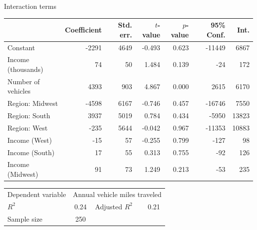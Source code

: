 \begin{frame}{Interaction terms}
  \small
  \begin{tabular}{lrrrrrr}
\toprule
{} &  Coefficient &  Std. err. &  $t$-value &  $p$-value &  95\% Conf. &   Int. \\
\midrule
Constant           &        -2291 &       4649 &     -0.493 &      0.623 &     -11449 &   6867 \\
Income (thousands) &           74 &         50 &      1.484 &      0.139 &        -24 &    172 \\
Number of vehicles &         4393 &        903 &      4.867 &      0.000 &       2615 &   6170 \\
Region: Midwest    &        -4598 &       6167 &     -0.746 &      0.457 &     -16746 &   7550 \\
Region: South      &         3937 &       5019 &      0.784 &      0.434 &      -5950 &  13823 \\
Region: West       &         -235 &       5644 &     -0.042 &      0.967 &     -11353 &  10883 \\
Income (West)      &          -15 &         57 &     -0.255 &      0.799 &       -127 &     98 \\
Income (South)     &           17 &         55 &      0.313 &      0.755 &        -92 &    126 \\
Income (Midwest)   &           91 &         73 &      1.249 &      0.213 &        -53 &    235 \\
\bottomrule
\end{tabular}
\begin{tabular}{lclc}
Dependent variable & \multicolumn{3}{l}{Annual vehicle miles traveled} \\
$R^2$ & 0.24 & Adjusted $R^2$ & 0.21 \\
Sample size & 250 && \\
\end{tabular}\\
\tiny\citenhts
\end{frame}

